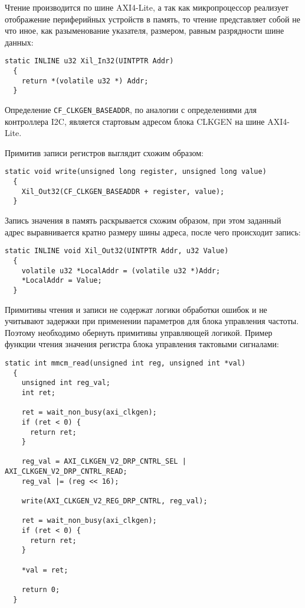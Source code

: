 Чтение производится по шине AXI4-Lite, а так как микропроцессор реализует
отображение периферийных устройств в память, то чтение представляет собой не что иное,
как разыменование указателя, размером, равным разрядности шине данных:
\medskip
\begin{lstlisting}[style=C]
  static INLINE u32 Xil_In32(UINTPTR Addr)
  {
	return *(volatile u32 *) Addr;
  }
\end{lstlisting}
\medskip

Определение \texttt{CF\_CLKGEN\_BASEADDR}, по аналогии с определениями для
контроллера I2C, является стартовым адресом блока CLKGEN на шине AXI4-Lite.

Примитив записи регистров выглядит схожим образом:
\medskip
\begin{lstlisting}[style=C]
  static void write(unsigned long register, unsigned long value)
  {
	Xil_Out32(CF_CLKGEN_BASEADDR + register, value);
  }
\end{lstlisting}
\medskip

Запись значения в память раскрывается схожим образом, при этом
заданный адрес выравнивается кратно размеру шины адреса, после
чего происходит запись:
\medskip
\begin{lstlisting}[style=C]
  static INLINE void Xil_Out32(UINTPTR Addr, u32 Value)
  {
	volatile u32 *LocalAddr = (volatile u32 *)Addr;
	*LocalAddr = Value;
  }
\end{lstlisting}
\medskip

Примитивы чтения и записи не содержат логики обработки ошибок и не учитывают
задержки при применении параметров для блока управления частоты. Поэтому
необходимо обернуть примитивы управляющей логикой. Пример функции чтения
значения регистра блока управления тактовыми сигналами:
\medskip
\begin{lstlisting}[style=C]
  static int mmcm_read(unsigned int reg, unsigned int *val)
  {
	unsigned int reg_val;
	int ret;

	ret = wait_non_busy(axi_clkgen);
	if (ret < 0) {
      return ret;
    }

	reg_val = AXI_CLKGEN_V2_DRP_CNTRL_SEL | AXI_CLKGEN_V2_DRP_CNTRL_READ;
	reg_val |= (reg << 16);

	write(AXI_CLKGEN_V2_REG_DRP_CNTRL, reg_val);

	ret = wait_non_busy(axi_clkgen);
	if (ret < 0) {
      return ret;
    }

	*val = ret;

	return 0;
  }
\end{lstlisting}
\medskip

